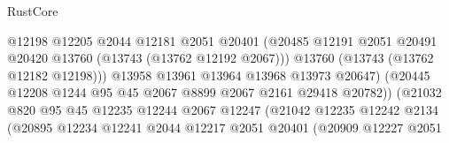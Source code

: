 \begin{lexlean}{RustCore}
\begin{coremodule}
                                          @12198
                                          @12205
                                          @2044
                                          @12181
                                          @2051
                                          @20401
                                          (@20485
                                            @12191
                                            @2051
                                            @20491
                                            @20420
                                            @13760
                                            (@13743 (@13762 @12192 @2067)))
                                          @13760
                                          (@13743 (@13762 @12182 @12198)))
                                        @13958
                                        @13961
                                        @13964
                                        @13968
                                        @13973
                                        @20647)
                                      (@20445
                                        @12208
                                        @1244
                                        @95
                                        @45
                                        @2067
                                        @8899
                                        @2067
                                        @2161
                                        @29418
                                        @20782))
                                    (@21032
                                      @820
                                      @95
                                      @45
                                      @12235
                                      @12244
                                      @2067
                                      @12247
                                      (@21042
                                        @12235
                                        @12242
                                        @2134
                                        (@20895
                                          @12234
                                          @12241
                                          @2044
                                          @12217
                                          @2051
                                          @20401
                                          (@20909
                                            @12227
                                            @2051

\end{coremodule}
\end{lexlean}
